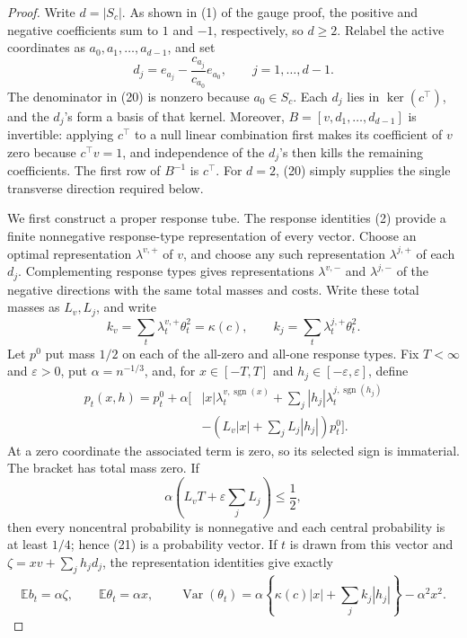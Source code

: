 \documentclass{article}
\begin{document}
\begin{proof}
Write \(d=|S_c|\).  As shown in (1) of the gauge proof, the positive and negative coefficients sum to \(1\) and \(-1\), respectively, so \(d\ge2\).  Relabel the active coordinates as \(a_0,a_1,\ldots,a_{d-1}\), and set
\[
d_j=e_{a_j}-\frac{c_{a_j}}{c_{a_0}}e_{a_0},
\qquad j=1,\ldots,d-1.
\tag{20}
\]
The denominator in (20) is nonzero because \(a_0\in S_c\).  Each \(d_j\) lies in \(\ker(c^\top)\), and the \(d_j\)'s form a basis of that kernel.  Moreover, \(B=[v,d_1,\ldots,d_{d-1}]\) is invertible: applying \(c^\top\) to a null linear combination first makes its coefficient of \(v\) zero because \(c^\top v=1\), and independence of the \(d_j\)'s then kills the remaining coefficients.  The first row of \(B^{-1}\) is \(c^\top\).  For \(d=2\), (20) simply supplies the single transverse direction required below.

We first construct a proper response tube.  The response identities (2) provide a finite nonnegative response-type representation of every vector.  Choose an optimal representation \(\lambda^{v,+}\) of \(v\), and choose any such representation \(\lambda^{j,+}\) of each \(d_j\).  Complementing response types gives representations \(\lambda^{v,-}\) and \(\lambda^{j,-}\) of the negative directions with the same total masses and costs.  Write these total masses as \(L_v,L_j\), and write
\[
k_v=\sum_t\lambda_t^{v,+}\theta_t^2=\kappa(c),
\qquad
k_j=\sum_t\lambda_t^{j,+}\theta_t^2.
\]
Let \(p^0\) put mass \(1/2\) on each of the all-zero and all-one response types.  Fix \(T<\infty\) and \(\varepsilon>0\), put \(\alpha=n^{-1/3}\), and, for \(x\in[-T,T]\) and \(h_j\in[-\varepsilon,\varepsilon]\), define
\[
\begin{split}
p_t(x,h)=p_t^0+\alpha\bigg[&|x|\lambda_t^{v,\operatorname{sgn}(x)}
+\sum_j|h_j|\lambda_t^{j,\operatorname{sgn}(h_j)}\\
&-\left(L_v|x|+\sum_jL_j|h_j|\right)p_t^0\bigg].
\end{split}
\tag{21}
\]
At a zero coordinate the associated term is zero, so its selected sign is immaterial.  The bracket has total mass zero.  If
\[
\alpha\left(L_vT+\varepsilon\sum_jL_j\right)\le\frac12,
\tag{22}
\]
then every noncentral probability is nonnegative and each central probability is at least \(1/4\); hence (21) is a probability vector.  If \(t\) is drawn from this vector and \(\zeta=xv+\sum_jh_jd_j\), the representation identities give exactly
\[
\mathbb Eb_t=\alpha\zeta,
\qquad
\mathbb E\theta_t=\alpha x,
\qquad
\operatorname{Var}(\theta_t)
=\alpha\left\{\kappa(c)|x|+\sum_jk_j|h_j|\right\}-\alpha^2x^2.
\tag{23}
\]


\end{proof}
\end{document}
